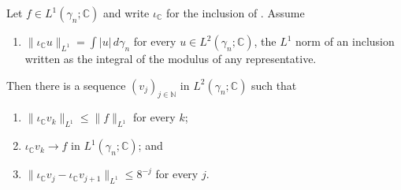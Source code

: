 \begin{lemma}
Let $f \in L^1(\gamma_n;\mathbb{C})$ and write $\iota_{\mathbb{C}}$ for the
inclusion of .  Assume
\begin{enumerate}
  \item[(N)] $\|\iota_{\mathbb{C}} u\|_{L^1} = \int |u|\,d\gamma_n$ for every
    $u \in L^2(\gamma_n;\mathbb{C})$, the $L^1$ norm of an inclusion written as
    the integral of the modulus of any representative.
\end{enumerate}
Then there is a sequence $(v_j)_{j\in\mathbb{N}}$ in $L^2(\gamma_n;\mathbb{C})$
such that
\begin{enumerate}
  \item $\|\iota_{\mathbb{C}} v_k\|_{L^1} \leq \|f\|_{L^1}$ for every $k$;
  \item $\iota_{\mathbb{C}} v_k \to f$ in $L^1(\gamma_n;\mathbb{C})$; and
  \item $\|\iota_{\mathbb{C}} v_j - \iota_{\mathbb{C}} v_{j+1}\|_{L^1}
    \leq 8^{-j}$ for every $j$.
\end{enumerate}
\end{lemma}
